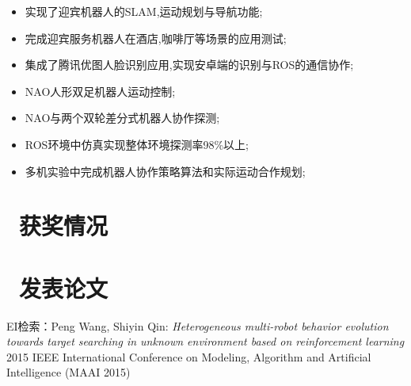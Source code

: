 \documentclass{resume}
\begin{document}

\begin{itemize}
  \item 实现了迎宾机器人的SLAM,运动规划与导航功能;
  \item 完成迎宾服务机器人在酒店,咖啡厅等场景的应用测试;
  \item 集成了腾讯优图人脸识别应用,实现安卓端的识别与ROS的通信协作;
\end{itemize}


\begin{onehalfspacing}
\begin{itemize}
  \item NAO人形双足机器人运动控制;
  \item NAO与两个双轮差分式机器人协作探测;
  \item ROS环境中仿真实现整体环境探测率98\%以上;
  \item 多机实验中完成机器人协作策略算法和实际运动合作规划;
\end{itemize}
\end{onehalfspacing}




\section{\faGratipay\ 获奖情况}

\section{\faBook\ 发表论文}
EI检索：Peng Wang, Shiyin Qin:
\textit{Heterogeneous multi-robot behavior evolution towards target searching in unknown environment based on reinforcement learning}
2015 IEEE International Conference on Modeling, Algorithm and Artificial Intelligence (MAAI 2015)
\end{document}
